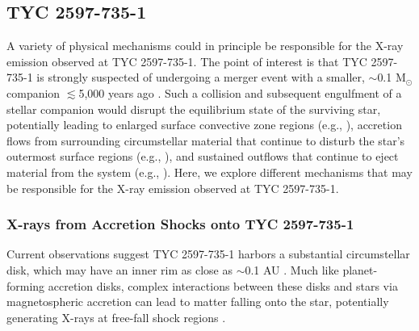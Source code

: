 \documentclass[linenumbers]{aastex631}
\begin{document}
\subsection{TYC 2597-735-1}
\label{sec:discussTYC}
A variety of physical mechanisms could in principle be responsible for the X-ray emission observed at TYC 2597-735-1. The point of interest is that TYC 2597-735-1 is strongly suspected of undergoing a merger event with a smaller, $\sim$0.1 M$_{\odot}$ companion $\lesssim$5,000 years ago \citep{2020Natur.587..387H}. Such a collision and subsequent engulfment of a stellar companion would disrupt the equilibrium state of the surviving star, potentially leading to enlarged surface convective zone regions (e.g., \citealt{1996ApJ...468..797L}), accretion flows from surrounding circumstellar material that continue to disturb the star's outermost surface regions (e.g., \citealt{2016MNRAS.461.2527P}), and sustained outflows that continue to eject material from the system (e.g., \citealt{Zuckerman_2008}). Here, we explore different mechanisms that may be responsible for the X-ray emission observed at TYC 2597-735-1.


\subsubsection{X-rays from Accretion Shocks onto TYC 2597-735-1}

Current observations suggest TYC 2597-735-1 harbors a substantial circumstellar disk, which may have an inner rim as close as $\sim$0.1 AU \citep{2020Natur.587..387H}. Much like planet-forming accretion disks, complex interactions between these disks and stars via magnetospheric accretion can lead to matter falling onto the star, potentially generating X-rays at free-fall shock regions \citep[e.g.][]{2007A&A...466.1111G}.
\end{document}
